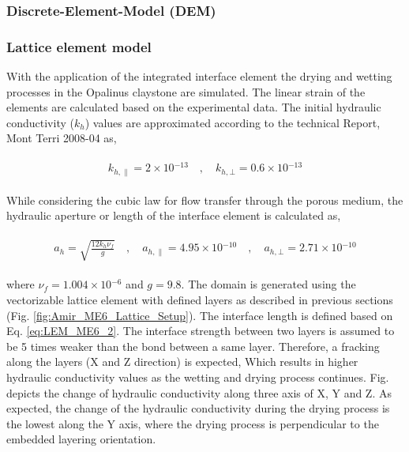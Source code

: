 \subsubsection*{Discrete-Element-Model (DEM)}

\subsubsection*{Lattice element model}

With the application of the integrated interface element \cite{Sattarietal2019b} the drying and wetting processes in the Opalinus claystone are simulated. The linear strain of the elements are calculated based on the experimental data. The initial hydraulic conductivity ($k_h$) values are approximated according to the technical Report, Mont Terri 2008-04 as,

\begin{align}
\label{eq:LEM_ME6_1}
\begin{split}
k_{h,\parallel}=2\times{10}{^{-13}}
\quad , \quad
k_{h,\bot}=0.6\times{10}{^{-13}}
\end{split}
\end{align}

While considering the cubic law for flow transfer through the porous medium, the hydraulic aperture or length of the interface element is calculated as,

\begin{align}
\label{eq:LEM_ME6_2}
\begin{split}
a_h=\sqrt{\frac{12k_h\nu_f}{g}}
\quad , \quad
a_{h,\parallel}=4.95\times{10}{^{-10}}
\quad , \quad
a_{h,\bot}=2.71\times{10}{^{-10}}
\end{split}
\end{align}

where $\nu_f=1.004\times{10}{^{-6}}$ and $g=9.8$. The domain is generated using the vectorizable lattice element with defined layers as described in previous sections (Fig. \ref{fig:Amir_ME6_Lattice_Setup}). The interface length is defined based on Eq. \ref{eq:LEM_ME6_2}. The interface strength between two layers is assumed to be 5 times weaker than the bond between a same layer. Therefore, a fracking along the layers (X and Z direction) is expected, Which results in higher hydraulic conductivity values as the wetting and drying process continues. Fig. depicts the change of hydraulic conductivity along three axis of X, Y and Z. As expected, the change of the hydraulic conductivity during the drying process is the lowest along the Y axis, where the drying process is perpendicular to the embedded layering orientation. 

